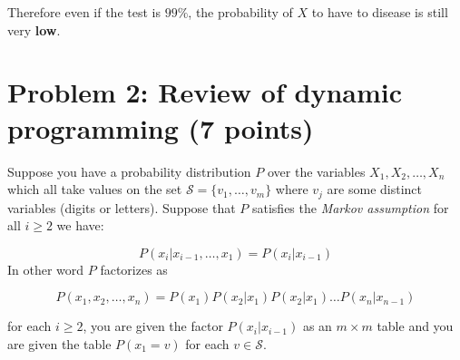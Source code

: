 \documentclass[10pt]{article}
\begin{document}
Therefore even if the test is $99\%$, the probability of $X$ to have to disease
is still very \textbf{low}.
\section*{Problem 2: Review of dynamic programming (7 points)}
Suppose you have a probability distribution $P$ over the variables $X_1, X_2,
\ldots, X_n$ which all take values on the set $\mathcal{S}=\{v_1, \ldots, v_m\}$ where
$v_j$ are some distinct variables (digits or letters). Suppose that $P$
satisfies the \emph{Markov assumption} for all $i\geq 2$ we have:


\begin{equation}
  \label{eq:markov_assumption}
  P(x_i| x_{i-1}, \ldots, x_1) = P(x_i| x_{i-1})
  \end{equation}
  In other word $P$ factorizes as

 \begin{equation}
   P(x_1,x_2,\ldots, x_n)  = P(x_1)P(x_2|x_1)P(x_2|x_1)\ldots P(x_n|x_{n-1})
   \end{equation}

   for each $i\geq 2$, you are given the factor $P(x_i|x_{i-1})$ as an $m\times
   m $ table and you are given the table $P(x_1= v)$ for each $v \in
   \mathcal{S}$.
\end{document}
